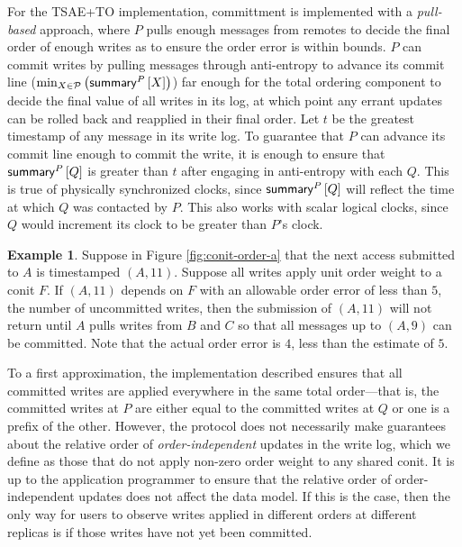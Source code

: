 \documentclass[]             %
{NASA}                       %
\theoremstyle{definition}
\newtheorem{example}[theorem]{Example}
\begin{document}
For the TSAE+TO implementation, committment is implemented with a
\emph{pull-based} approach, where $P$ pulls enough messages from
remotes to decide the final order of enough writes as to ensure the
order error is within bounds. $P$ can commit writes by pulling
messages through anti-entropy to advance its commit line
($\min_{X \in \mathcal{P}} \left(\mathsf{summary}^{P}\left[X\right]\right)$) far enough for
the total ordering component to decide the final value of all writes
in its log, at which point any errant updates can be rolled back and
reapplied in their final order. Let $t$ be the greatest timestamp of
any message in its write log. To guarantee that $P$ can advance its
commit line enough to commit the write, it is enough to ensure that
$\mathsf{summary}^{P}\left[Q\right]$ is greater than $t$ after engaging in anti-entropy
with each $Q$. This is true of physically synchronized clocks, since
$\mathsf{summary}^{P}\left[Q\right]$ will reflect the time at which $Q$ was contacted by
$P$. This also works with scalar logical clocks, since $Q$ would
increment its clock to be greater than $P$'s clock.

\begin{example}
  Suppose in Figure \ref{fig:conit-order-a} that the next access
  submitted to $A$ is timestamped $(A, 11)$. Suppose all writes apply
  unit order weight to a conit $F$. If $(A, 11)$ depends on $F$ with
  an allowable order error of less than $5$, the number of uncommitted
  writes, then the submission of $(A, 11)$ will not return until $A$
  pulls writes from $B$ and $C$ so that all messages up to $(A, 9)$
  can be committed. Note that the actual order error is $4$, less than
  the estimate of $5$.
\end{example}

To a first approximation, the implementation described ensures that
all committed writes are applied everywhere in the same total
order---that is, the committed writes at $P$ are either equal to the
committed writes at $Q$ or one is a prefix of the other. However, the
protocol does not necessarily make guarantees about the relative order
of \emph{order-independent} updates in the write log, which we define
as those that do not apply non-zero order weight to any shared
conit. It is up to the application programmer to ensure that the
relative order of order-independent updates does not affect the data
model. If this is the case, then the only way for users to observe
writes applied in different orders at different replicas is if those
writes have not yet been committed.
\end{document}
